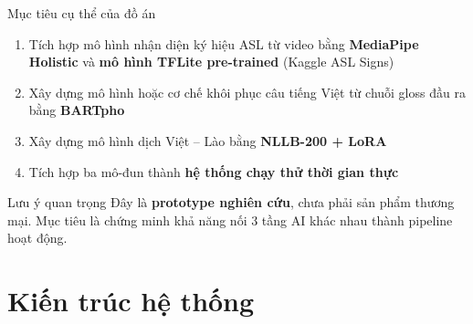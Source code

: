 ﻿\documentclass[aspectratio=169, 11pt]{beamer}
\begin{document}
\begin{frame}{Mục tiêu cụ thể của đồ án}
    \begin{enumerate}
        \item Tích hợp mô hình nhận diện ký hiệu ASL từ video bằng \textbf{MediaPipe Holistic} và \textbf{mô hình TFLite pre-trained} (Kaggle ASL Signs)
        \item Xây dựng mô hình hoặc cơ chế khôi phục câu tiếng Việt từ chuỗi gloss đầu ra bằng \textbf{BARTpho}
        \item Xây dựng mô hình dịch Việt -- Lào bằng \textbf{NLLB-200 + LoRA}
        \item Tích hợp ba mô-đun thành \textbf{hệ thống chạy thử thời gian thực}
    \end{enumerate}

    \vspace{0.3cm}
    \begin{alertblock}{Lưu ý quan trọng}
        \small Đây là \textbf{prototype nghiên cứu}, chưa phải sản phẩm thương mại. Mục tiêu là chứng minh khả năng nối 3 tầng AI khác nhau thành pipeline hoạt động.
    \end{alertblock}
\end{frame}

\section{Kiến trúc hệ thống}
\end{document}
